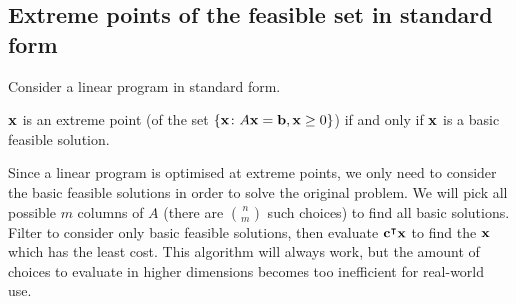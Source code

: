 \subsection{Extreme points of the feasible set in standard form}
Consider a linear program in standard form.
\begin{theorem}
	\( \vb x \) is an extreme point (of the set \( \{ \vb x \colon A \vb x = \vb b, \vb x \geq 0 \} \)) if and only if \( \vb x \) is a basic feasible solution.
\end{theorem}
\begin{remark}
	Since a linear program is optimised at extreme points, we only need to consider the basic feasible solutions in order to solve the original problem.
	We will pick all possible \( m \) columns of \( A \) (there are \( \binom{n}{m} \) such choices) to find all basic solutions.
	Filter to consider only basic feasible solutions, then evaluate \( \vb c^\intercal \vb x \) to find the \( \vb x \) which has the least cost.
	This algorithm will always work, but the amount of choices to evaluate in higher dimensions becomes too inefficient for real-world use.
\end{remark}
